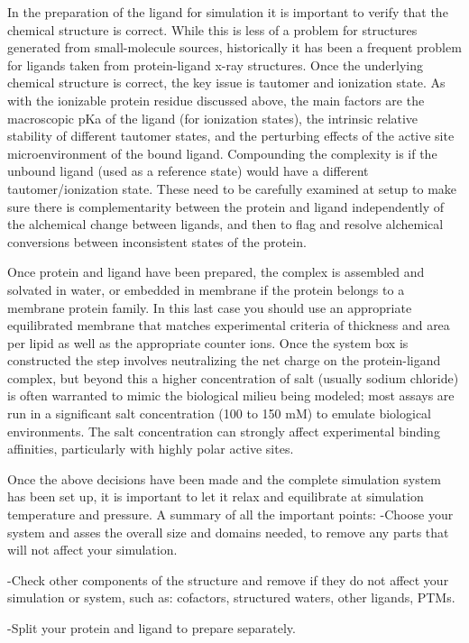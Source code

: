 \documentclass[9pt,bestpractices]{livecoms}
\begin{document}
In the preparation of the ligand for simulation it is important to verify that the chemical structure is correct. While this is less of a problem for structures generated from small-molecule sources, historically it has been a frequent problem for ligands taken from protein-ligand x-ray structures. Once the underlying chemical structure is correct, the key issue is tautomer and ionization state. As with the ionizable protein residue discussed above, the main factors are the macroscopic pKa of the ligand (for ionization states), the intrinsic relative stability of different tautomer states, and the perturbing effects of the active site microenvironment of the bound ligand. Compounding the complexity is if the unbound ligand (used as a reference state) would have a different tautomer/ionization state. These need to be carefully examined at setup to make sure there is complementarity between the protein and ligand independently of the alchemical change between ligands, and then to flag and resolve alchemical conversions between inconsistent states of the protein.

Once protein and ligand have been prepared, the complex is assembled and solvated in water, or embedded in membrane if the protein belongs to a membrane protein family. In this last case you should use an appropriate equilibrated membrane that matches experimental criteria of thickness and area per lipid as well as the appropriate counter ions. Once the system box is constructed the step involves neutralizing the net charge on the protein-ligand complex, but beyond this a higher concentration of salt (usually sodium chloride) is often warranted to mimic the biological milieu being modeled; most assays are run in a significant salt concentration (100 to 150 mM) to emulate biological environments. The salt concentration can strongly affect experimental binding affinities, particularly with highly polar active sites.

Once the above decisions have been made and the complete simulation system has been set up, it is important to let it relax and equilibrate at simulation temperature and pressure.
A summary of all the important points:
-Choose your system and asses the overall size and domains needed, to remove any parts that will not affect your simulation.

-Check other components of the structure and remove if they do not affect your simulation or system, such as: cofactors, structured waters, other ligands, PTMs.

-Split your protein and ligand to prepare separately.
\end{document}
